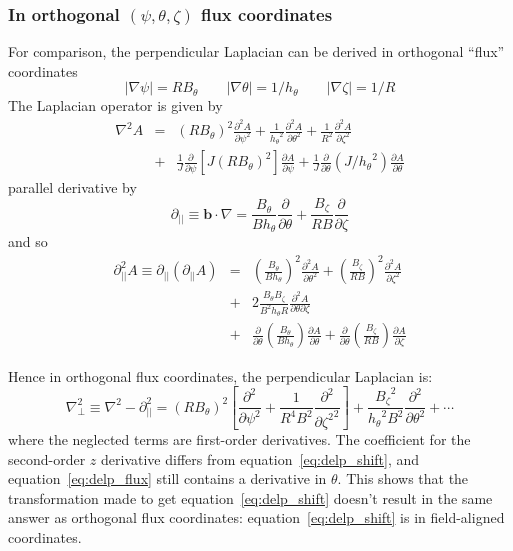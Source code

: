 \documentclass[12pt]{article}
\newcommand{\deriv}[2]{\ensuremath{\frac{\partial #1}{\partial #2}}}
\newcommand{\dderiv}[2]{\ensuremath{\frac{\partial^2 #1}{\partial {#2}^2}}}
\newcommand{\hthe}{\ensuremath{h_\theta}}
\newcommand{\Bp}{\ensuremath{B_\theta}}
\newcommand{\Bt}{\ensuremath{B_\zeta}}
\newcommand{\Vec}[1]{\ensuremath{\mathbf{#1}}}
\newcommand{\bvec}{\Vec{b}}
\newcommand{\delp}{\nabla_\perp^2}
\newcommand{\rbp}{\ensuremath{R\Bp}}
\newcommand{\rbpsq}{\ensuremath{\left(\rbp\right)^2}}
\begin{document}
\subsubsection{In orthogonal $\left(\psi, \theta, \zeta\right)$ flux coordinates}
For comparison, the perpendicular Laplacian can be derived in orthogonal ``flux'' coordinates
\[
\left|\nabla\psi\right| = \rbp \qquad \left|\nabla\theta\right| = 1/\hthe \qquad \left|\nabla\zeta\right| = 1/R
\]
The Laplacian operator is given by
\begin{eqnarray}
\nabla^2 A &=& \rbpsq\dderiv{A}{\psi} + \frac{1}{\hthe^2}\dderiv{A}{\theta} + \frac{1}{R^2}\dderiv{A}{\zeta} \nonumber \\
&+& \frac{1}{J}\deriv{}{\psi}\left[J\rbpsq\right]\deriv{A}{\psi} + \frac{1}{J}\deriv{}{\theta}\left(J/\hthe^2\right)\deriv{A}{\theta} 
\end{eqnarray}
parallel derivative by
\begin{equation}
\partial_{||} \equiv \bvec\cdot\nabla = \frac{\Bp}{B\hthe}\deriv{}{\theta} + \frac{\Bt}{RB}\deriv{}{\zeta}
\end{equation}
and so
\begin{eqnarray}
\partial^2_{||}A \equiv \partial_{||}\left(\partial_{||}A\right) &=& \left(\frac{\Bp}{B\hthe}\right)^2\dderiv{A}{\theta} + \left(\frac{\Bt}{RB}\right)^2\dderiv{A}{\zeta} \nonumber \\
&+& 2\frac{\Bp\Bt}{B^2\hthe R}\frac{\partial^2 A}{\partial\theta\partial\zeta} \nonumber \\
&+& \deriv{}{\theta}\left(\frac{\Bp}{B\hthe}\right)\deriv{A}{\theta} + \deriv{}{\theta}\left(\frac{\Bt}{RB}\right)\deriv{A}{\zeta}
\end{eqnarray}

Hence in orthogonal flux coordinates, the perpendicular Laplacian is:
\begin{equation}
\delp \equiv \nabla^2 - \partial_{||}^2 = \rbpsq\left[\dderiv{}{\psi} + \frac{1}{R^4B^2}\dderiv{}{\zeta^2}\right] + \frac{\Bt^2}{\hthe^2B^2}\dderiv{}{\theta} + \cdots
\label{eq:delp_flux}
\end{equation} 
where the neglected terms are first-order derivatives. The coefficient for the second-order $z$
derivative differs from equation~\ref{eq:delp_shift}, and equation~\ref{eq:delp_flux} still contains a derivative in $\theta$. This shows that the transformation made to get equation~\ref{eq:delp_shift} doesn't result in the same answer as orthogonal flux coordinates: equation~\ref{eq:delp_shift} is in field-aligned coordinates.
\end{document}
